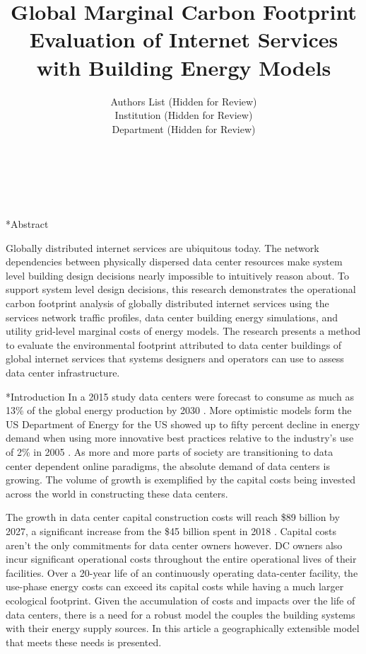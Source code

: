 \documentclass[twocolumn, a4paper,10pt]{article}
\title{%
Global Marginal Carbon Footprint Evaluation of Internet Services\\				%
\vspace{4pt}
with Building Energy Models} 																																		%
\author{
Authors List (Hidden for Review)\\ %
Institution (Hidden for Review) \\ %
Department (Hidden for Review)\\ %
  \\%
  \\ %
  \\ %
\phantom{Line 9}} 																																											%
\date{\vspace{-0.5cm}}	%
\makeatletter
\renewcommand\section{\@startsection{section}{1}{\z@}{3pt}{3pt}{\normalfont\large\bfseries}}
\makeatother
\begin{document}
\maketitle


\section*{Abstract}	%
\addtocounter{section}{1}
Globally distributed internet services are ubiquitous today. The network dependencies between physically dispersed data center resources make system level building design decisions nearly impossible to intuitively reason about. To support system level design decisions, this research demonstrates the operational carbon footprint analysis of globally distributed internet services using the service\textsc{}s network traffic profiles, data center building energy simulations, and utility grid-level marginal costs of energy models. The research presents a method to evaluate the environmental footprint attributed to data center buildings of global internet services that systems designers and operators can use to assess data center infrastructure.


\section*{Introduction}
In a 2015 study data centers were forecast to consume as much as 13\% of the global energy production by 2030 \citep{andrae15}. More optimistic models form the US Department of Energy for the US showed up to fifty percent decline in energy demand when using more innovative best practices relative to the industry’s use of 2\% in 2005 \citep{Shehabi16}. As more and more parts of society are transitioning to data center dependent online paradigms, the absolute demand of data centers is growing. The volume of growth is exemplified by the capital costs being invested across the world in constructing these data centers.

The growth in data center capital construction costs will reach \$89 billion by 2027, a significant increase from the \$45 billion spent in 2018 \citep{dcmarket19}. Capital costs aren’t the only commitments for data center owners however. DC owner\textsc{}s also incur significant operational costs throughout the entire operational lives of their facilities.  Over a 20-year life of an continuously operating data-center facility, the use-phase energy costs can exceed its capital costs while having a much larger ecological footprint. Given the accumulation of  costs and impacts over the life of data centers, there is a need for a robust model the couples the building systems with their energy supply sources. In this article a geographically extensible model that meets these needs is presented.
\end{document}
